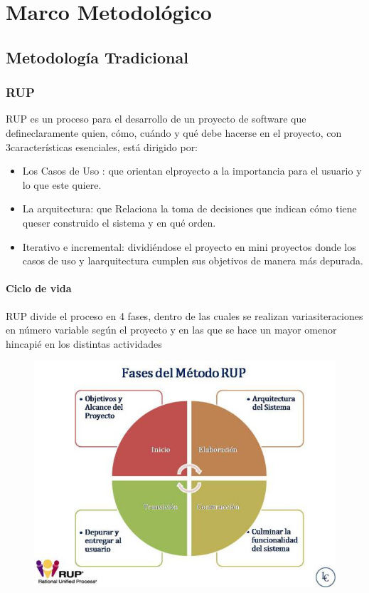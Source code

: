 \chapter{Marco Metodológico}


\section{Metodología Tradicional} 
\subsection{RUP}

 RUP es un proceso para el desarrollo de un proyecto de software que defineclaramente quien, cómo, cuándo y qué debe hacerse en el proyecto, con 3características esenciales, está dirigido por:

\begin{itemize}

    \item Los Casos de Uso : que orientan elproyecto a la importancia para el usuario y lo que este quiere. 

    \item La arquitectura: que Relaciona la toma de decisiones que indican cómo tiene queser construido el sistema y en qué orden.

    \item Iterativo e incremental: dividiéndose el proyecto en mini proyectos donde los casos de uso y laarquitectura cumplen sus objetivos de manera más depurada.

\end{itemize}


\subsubsection{Ciclo de vida}
RUP divide el proceso en 4 fases, dentro de las cuales se realizan variasiteraciones en número variable según el proyecto y en las que se hace un mayor omenor hincapié en los distintas actividades
\begin{figure}[!htb]
	\includegraphics[width=\linewidth]{img/fases-rup.jpg}
	\endminipage\hfill
	
\end{figure}


